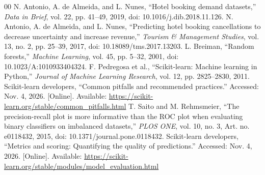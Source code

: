 \documentclass[conference]{IEEEtran}
\begin{document}
\begin{thebibliography}{00}
 N. Antonio, A. de Almeida, and L. Nunes, ``Hotel booking demand datasets,'' \emph{Data in Brief}, vol. 22, pp. 41--49, 2019, doi: 10.1016/j.dib.2018.11.126.
 N. Antonio, A. de Almeida, and L. Nunes, ``Predicting hotel booking cancellations to decrease uncertainty and increase revenue,'' \emph{Tourism \& Management Studies}, vol. 13, no. 2, pp. 25--39, 2017, doi: 10.18089/tms.2017.13203.
 L. Breiman, ``Random forests,'' \emph{Machine Learning}, vol. 45, pp. 5--32, 2001, doi: 10.1023/A:1010933404324.
 F. Pedregosa et al., ``Scikit-learn: Machine learning in Python,'' \emph{Journal of Machine Learning Research}, vol. 12, pp. 2825--2830, 2011.
 Scikit-learn developers, ``Common pitfalls and recommended practices.'' Accessed: Nov. 4, 2026. [Online]. Available: \url{https://scikit-learn.org/stable/common_pitfalls.html}
 T. Saito and M. Rehmsmeier, ``The precision-recall plot is more informative than the ROC plot when evaluating binary classifiers on imbalanced datasets,'' \emph{PLOS ONE}, vol. 10, no. 3, Art. no. e0118432, 2015, doi: 10.1371/journal.pone.0118432.
 Scikit-learn developers, ``Metrics and scoring: Quantifying the quality of predictions.'' Accessed: Nov. 4, 2026. [Online]. Available: \url{https://scikit-learn.org/stable/modules/model_evaluation.html}
\end{thebibliography}
\end{document}
